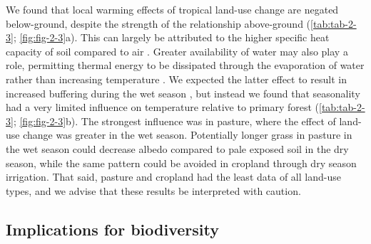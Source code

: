 \documentclass[12pt,a4paper,]{report}
\theoremstyle{definition}
\theoremstyle{definition}
\theoremstyle{definition}
\theoremstyle{remark}
\begin{document}
We found that local warming effects of tropical land-use change are
negated below-ground, despite the strength of the relationship
above-ground (\autoref{tab:tab-2-3}; \autoref{fig:fig-2-3}a). This can
largely be attributed to the higher specific heat capacity of soil
compared to air \citep{oke_boundary_1987}. Greater availability of water
may also play a role, permitting thermal energy to be dissipated through
the evaporation of water rather than increasing temperature
\citep{oke_boundary_1987, davin_climatic_2010, christidis_role_2013}. We
expected the latter effect to result in increased buffering during the
wet season \citep[cf.][]{findell_modeled_2007, davin_climatic_2010}, but
instead we found that seasonality had a very limited influence on
temperature relative to primary forest (\autoref{tab:tab-2-3};
\autoref{fig:fig-2-3}b). The strongest influence was in pasture, where
the effect of land-use change was greater in the wet season. Potentially
longer grass in pasture in the wet season could decrease albedo compared
to pale exposed soil in the dry season, while the same pattern could be
avoided in cropland through dry season irrigation. That said, pasture
and cropland had the least data of all land-use types, and we advise
that these results be interpreted with caution.

\subsection{Implications for
biodiversity}\label{implications-for-biodiversity}
\end{document}

